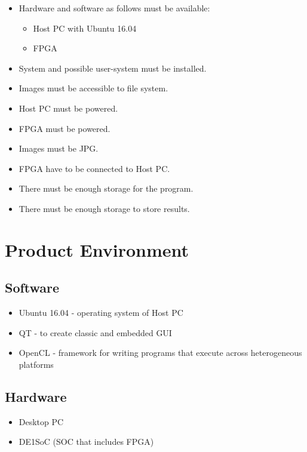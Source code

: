 \documentclass[parskip=full]{scrartcl}
\begin{document}
\begin{itemize}
	\item Hardware and software as follows must be available: 
	\begin{itemize}
		\item Host PC with Ubuntu 16.04
		\item FPGA
	\end{itemize}
	\item System and possible user-system must be installed.
	\item Images must be accessible to file system.
	\item Host PC must be powered.
	\item FPGA must be powered.
	\item Images must be JPG.
	\item FPGA have to be connected to Host PC.
	\item There must be enough storage for the program.
	\item There must be enough storage to store results. 
\end{itemize}

\pagebreak





\section{Product Environment}

\subsection{Software}

\begin{itemize}
	\item Ubuntu 16.04 - operating system of Host PC
	\item QT - to create classic and embedded GUI
	\item OpenCL - framework for writing programs that execute across heterogeneous platforms
\end{itemize}

\subsection{Hardware}

\begin{itemize}
	\item Desktop PC
	\item DE1SoC (SOC that includes FPGA)
\end{itemize}
 
\end{document}

